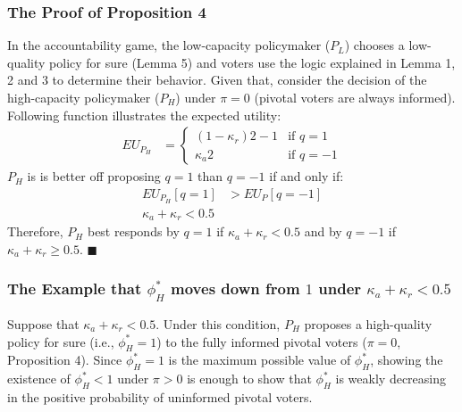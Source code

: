 \subsubsection{The Proof of Proposition 4}

\par In the accountability game, the low-capacity policymaker ($P_L$) chooses a low-quality policy for sure (Lemma 5) and voters use the logic explained in Lemma 1, 2 and 3 to determine their behavior. Given that, consider the decision of the high-capacity policymaker ($P_H$) under $\pi=0$ (pivotal voters are always informed). Following function illustrates the expected utility:
\begin{align*}
EU_{P_H} &= 
\begin{cases}
(1-\kappa_{r}) 2 - 1  & \text{if $q=1$} \\
\kappa_{a} 2  & \text{if $q=-1$} 
\end{cases} 
\end{align*}
$P_H$ is is better off proposing $q=1$ than $q=-1$ if and only if:
\begin{align*}
EU_{P_H}[q=1] &> EU_P[q=-1] \\
\kappa_{a} + \kappa_{r} < 0.5
\end{align*}
Therefore, $P_H$ best responds by $q=1$ if $\kappa_{a} + \kappa_{r} < 0.5$ and by $q=-1$ if $\kappa_{a} + \kappa_{r} \geq 0.5$. 
\hfill $\blacksquare$

\subsubsection{The Example that $\phi^*_H$ moves down from $1$ under $\kappa_{a} + \kappa_{r} < 0.5$}

\par Suppose that $\kappa_a+\kappa_r<0.5$. Under this condition, $P_H$ proposes a high-quality policy for sure (i.e., $\phi^*_H=1$) to the fully informed pivotal voters ($\pi=0$, Proposition 4). Since $\phi^*_H=1$ is the maximum possible value of $\phi^*_H$, showing the existence of $\phi^*_H<1$ under $\pi>0$ is enough to show that $\phi^*_H$ is weakly decreasing in the positive probability of uninformed pivotal voters. 


